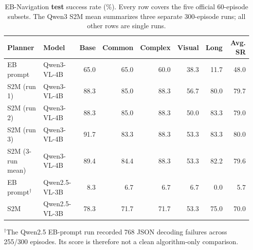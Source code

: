 \begin{table}[t]
\centering
\small
\caption{EB-Navigation \textbf{test} success rate (\%). Every row covers the five official 60-episode
subsets. The Qwen3 S2M mean summarizes three separate 300-episode runs; all other rows are single runs.}
\label{tab:main}
\begin{tabular}{llrrrrrr}
\toprule
Planner & Model & Base & Common & Complex & Visual & Long & Avg. SR \\
\midrule
EB prompt & Qwen3-VL-4B & 65.0 & 65.0 & 60.0 & 38.3 & 11.7 & 48.0 \\
S2M (run 1) & Qwen3-VL-4B & 88.3 & 85.0 & 88.3 & 56.7 & 80.0 & 79.7 \\
S2M (run 2) & Qwen3-VL-4B & 88.3 & 85.0 & 88.3 & 50.0 & 83.3 & 79.0 \\
S2M (run 3) & Qwen3-VL-4B & 91.7 & 83.3 & 88.3 & 53.3 & 83.3 & 80.0 \\
S2M (3-run mean) & Qwen3-VL-4B & 89.4 & 84.4 & 88.3 & 53.3 & 82.2 & 79.6 \\
\midrule
EB prompt$^\dagger$ & Qwen2.5-VL-3B & 8.3 & 6.7 & 6.7 & 6.7 & 0.0 & 5.7 \\
S2M & Qwen2.5-VL-3B & 78.3 & 71.7 & 71.7 & 53.3 & 75.0 & 70.0 \\
\bottomrule
\end{tabular}

\vspace{0.25em}\footnotesize $^\dagger$The Qwen2.5 EB-prompt run recorded 768 JSON decoding failures across
255/300 episodes. Its score is therefore not a clean algorithm-only comparison.
\end{table}

\begin{table}[t]
\centering
\scriptsize
\caption{One-run S2M component checks on the EB-Navigation test set (Qwen3-VL-4B; 300 episodes each).
These are descriptive comparisons, not significance tests.}
\label{tab:abl}
\end{table}

